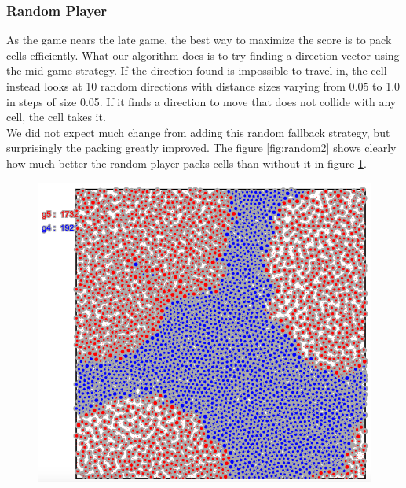 \subsubsection{Random Player}
As the game nears the late game, the best way to maximize the score is to pack cells efficiently. What our algorithm does is to try finding a direction vector using the mid game strategy. If the direction found is impossible to travel in, the cell instead looks at 10 random directions with distance sizes varying from 0.05 to 1.0 in steps of size 0.05. If it finds a direction to move that does not collide with any cell, the cell takes it.\\
We did not expect much change from adding this random fallback strategy, but surprisingly the packing greatly improved. The figure \ref{fig:random2} shows clearly how much better the random player packs cells than without it in figure \ref{fig:random1}.\\
\begin{figure}[h]
\center
\includegraphics[scale=0.3]{random1.png}
\caption{}
\label{fig:random1}
\end{figure}

